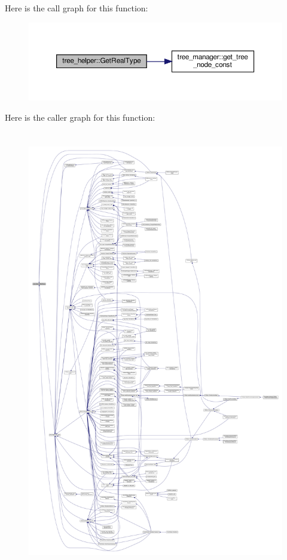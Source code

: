 Here is the call graph for this function\+:
\nopagebreak
\begin{figure}[H]
\begin{center}
\leavevmode
\includegraphics[width=350pt]{d7/d99/classtree__helper_a0b08c720b4d1a44705b5bbc47b915f79_cgraph}
\end{center}
\end{figure}
Here is the caller graph for this function\+:
\nopagebreak
\begin{figure}[H]
\begin{center}
\leavevmode
\includegraphics[height=550pt]{d7/d99/classtree__helper_a0b08c720b4d1a44705b5bbc47b915f79_icgraph}
\end{center}
\end{figure}
\mbox{\label{classtree__helper_af7f5272cbd83bc074170b7ef3a0e9d5f}} 
